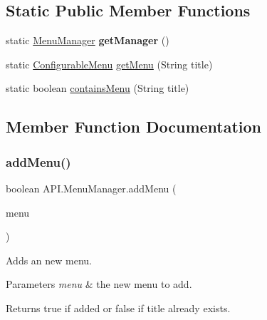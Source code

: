 \subsection*{Static Public Member Functions}
\begin{DoxyCompactItemize}
\item 
\mbox{\label{class_a_p_i_1_1_menu_manager_a0511013bead3b317121406197845d7b0}} 
static \hyperlink{class_a_p_i_1_1_menu_manager}{Menu\+Manager} {\bfseries get\+Manager} ()
\item 
static \hyperlink{class_a_p_i_1_1_configurable_menu}{Configurable\+Menu} \hyperlink{class_a_p_i_1_1_menu_manager_a42fe754044645b83635c8611ce2f1870}{get\+Menu} (String title)
\item 
static boolean \hyperlink{class_a_p_i_1_1_menu_manager_a79ec953890a2548a05a13b483adb424e}{contains\+Menu} (String title)
\end{DoxyCompactItemize}


\subsection{Member Function Documentation}
\mbox{\label{class_a_p_i_1_1_menu_manager_a19ba30dd360343792e18b81b621b1a1b}} 
\subsubsection{\texorpdfstring{add\+Menu()}{addMenu()}}
{\footnotesize\ttfamily boolean A\+P\+I.\+Menu\+Manager.\+add\+Menu (\begin{DoxyParamCaption}\item[{\hyperlink{class_a_p_i_1_1_configurable_menu}{Configurable\+Menu}}]{menu }\end{DoxyParamCaption})\hspace{0.3cm}{\ttfamily [inline]}}

Adds an new menu. 
\begin{DoxyParams}{Parameters}
{\em menu} & the new menu to add. \\
\hline
\end{DoxyParams}
\begin{DoxyReturn}{Returns}
true if added or false if title already exists. 
\end{DoxyReturn}
\mbox{\label{class_a_p_i_1_1_menu_manager_a79ec953890a2548a05a13b483adb424e}} 
